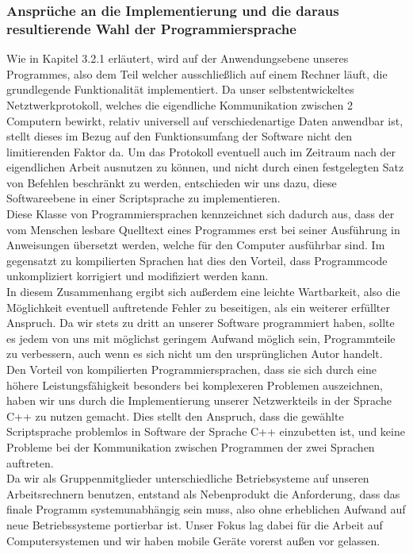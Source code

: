 \documentclass[12pt, a4paper]{scrartcl}
\begin{document}
\subsubsection{Ansprüche an die Implementierung und die daraus resultierende Wahl der Programmiersprache}
Wie in Kapitel 3.2.1 erläutert, wird auf der Anwendungsebene unseres Programmes, also dem Teil welcher ausschließlich auf einem Rechner läuft, die grundlegende Funktionalität implementiert. Da unser selbstentwickeltes Netztwerkprotokoll, welches die eigendliche Kommunikation zwischen 2 Computern bewirkt, relativ universell auf verschiedenartige Daten anwendbar ist, stellt dieses im Bezug auf den Funktionsumfang der Software nicht den limitierenden Faktor da. Um das Protokoll eventuell auch im Zeitraum nach der eigendlichen Arbeit ausnutzen zu können, und nicht durch einen festgelegten Satz von Befehlen beschränkt zu werden, entschieden wir uns dazu, diese Softwareebene in einer Scriptsprache zu implementieren.\\
Diese Klasse von Programmiersprachen kennzeichnet sich dadurch aus, dass der vom Menschen lesbare Quelltext eines Programmes erst bei seiner Ausführung in Anweisungen übersetzt werden, welche für den Computer ausführbar sind. Im gegensatzt zu kompilierten Sprachen hat dies den Vorteil, dass Programmcode unkompliziert korrigiert und modifiziert werden kann.\\
In diesem Zusammenhang ergibt sich außerdem eine leichte Wartbarkeit, also die Möglichkeit eventuell auftretende Fehler zu beseitigen, als ein weiterer erfüllter Anspruch. Da wir stets zu dritt an unserer Software programmiert haben, sollte es jedem von uns mit möglichst geringem Aufwand möglich sein, Programmteile zu verbessern, auch wenn es sich nicht um den ursprünglichen Autor handelt.\\
Den Vorteil von kompilierten Programmiersprachen, dass sie sich durch eine höhere Leistungsfähigkeit besonders bei komplexeren Problemen auszeichnen, haben wir uns durch die Implementierung unserer Netzwerkteils in der Sprache C++ zu nutzen gemacht. Dies stellt den Anspruch, dass die gewählte Scriptsprache problemlos in Software der Sprache C++ einzubetten ist, und keine Probleme bei der Kommunikation zwischen Programmen der zwei Sprachen auftreten.\\
Da wir als Gruppenmitglieder unterschiedliche Betriebsysteme auf unseren Arbeitsrechnern benutzen, entstand als Nebenprodukt die Anforderung, dass das finale Programm systemunabhängig sein muss, also ohne erheblichen Aufwand auf neue Betriebssysteme portierbar ist. Unser Fokus lag dabei für die Arbeit auf Computersystemen und wir haben mobile Geräte vorerst außen vor gelassen.
\end{document}
